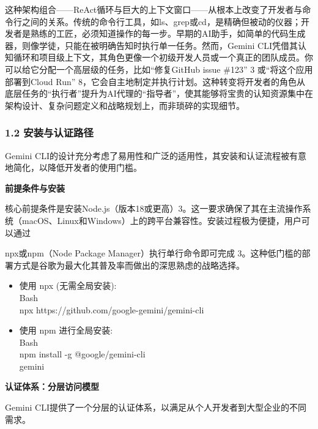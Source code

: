 \documentclass[a4paper,12pt]{article}
\begin{document}
\begin{multicols}{2}
    这种架构组合------ReAct循环与巨大的上下文窗口------从根本上改变了开发者与命令行之间的关系。传统的命令行工具，如ls、grep或cd，是精确但被动的仪器；开发者是熟练的工匠，必须知道操作的每一步。早期的AI助手，如简单的代码生成器，则像学徒，只能在被明确告知时执行单一任务。然而，Gemini
    CLI凭借其认知循环和项目级上下文，其角色更像一个初级开发人员或一个真正的团队成员。你可以给它分配一个高层级的任务，比如``修复GitHub
    issue \#123'' 3 或``将这个应用部署到Cloud Run''
    8，它会自主地制定并执行计划。这种转变将开发者的角色从底层任务的``执行者''提升为AI代理的``指导者''，使其能够将宝贵的认知资源集中在架构设计、复杂问题定义和战略规划上，而非琐碎的实现细节。

    \subsubsection{\texorpdfstring{\textbf{1.2
    安装与认证路径}}{1.2 安装与认证路径}}\label{ux5b89ux88c5ux4e0eux8ba4ux8bc1ux8defux5f84}

    Gemini
    CLI的设计充分考虑了易用性和广泛的适用性，其安装和认证流程被有意地简化，以降低开发者的使用门槛。

    \textbf{前提条件与安装}

    核心前提条件是安装Node.js（版本18或更高）3。这一要求确保了其在主流操作系统（macOS、Linux和Windows）上的跨平台兼容性。安装过程极为便捷，用户可以通过

    npx或npm（Node Package Manager）执行单行命令即可完成
    3。这种低门槛的部署方式是谷歌为最大化其普及率而做出的深思熟虑的战略选择。

    \begin{itemize}
    \item
      使用 npx (无需全局安装):\\
      Bash\\
      npx https://github.com/google-gemini/gemini-cli
    \item
      使用 npm 进行全局安装:\\
      Bash\\
      npm install -g @google/gemini-cli\\
      gemini
    \end{itemize}

    \textbf{认证体系：分层访问模型}

    Gemini
    CLI提供了一个分层的认证体系，以满足从个人开发者到大型企业的不同需求。


\end{multicols}
\end{document}
